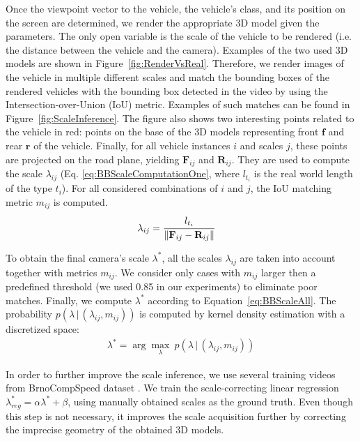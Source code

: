 \documentclass[]{elsarticle}
\begin{document}
Once the viewpoint vector to the vehicle, the vehicle's class, and its position on the screen are determined, we render the appropriate 3D model given the parameters.  The only open variable is the scale of the vehicle to be rendered (i.e. the distance between the vehicle and the camera).
Examples of the two used 3D models are shown in Figure~\ref{fig:RenderVsReal}. Therefore, we render images of the vehicle in multiple different scales and match the bounding boxes of the rendered vehicles with the bounding box detected in the video by using the Intersection-over-Union (IoU) metric. Examples of such matches can be found in Figure~\ref{fig:ScaleInference}. 
The figure also shows two interesting points related to the vehicle in red: points on the base of the 3D models representing front $\mathbf{f}$ and rear $\mathbf{r}$ of the vehicle. Finally, for all vehicle instances $i$ and scales $j$, these points are projected on the road plane, yielding $\mathbf{F}_{ij}$ and $\mathbf{R}_{ij}$. They are used to compute the scale $\lambda_{ij}$ (Eq. \eqref{eq:BBScaleComputationOne}, where $l_{t_i}$ is the real world length of the type $t_i$). 
For all considered combinations of $i$ and $j$, the IoU matching metric $m_{ij}$ is computed.
\begin{eqnarray}
&\lambda_{ij} = \cfrac{l_{t_i}}{\|\mathbf{F}_{ij}-\mathbf{R}_{ij}\|} &\label{eq:BBScaleComputationOne}
\end{eqnarray}



To obtain the final camera's scale $\lambda^*$, all the scales $\lambda_{ij}$ are taken into account together with metrics $m_{ij}$.  We consider only cases with $m_{ij}$ larger then a predefined threshold (we used 0.85 in our experiments) to eliminate poor matches. Finally, we compute $\lambda^*$ according to Equation~\eqref{eq:BBScaleAll}. The probability $p\left(\lambda\,|\,(\lambda_{ij}, m_{ij}) \right)$ is computed by kernel density estimation with a discretized space:
\begin{eqnarray}
&\lambda^* = \arg \max_\lambda~p\left(\lambda\,|\,(\lambda_{ij}, m_{ij}) \right) &\label{eq:BBScaleAll}
\end{eqnarray}

In order to further improve the scale inference, we use several training videos from BrnoCompSpeed dataset \citep{BrnoCompSpeed}. We train the scale-correcting linear regression $\lambda^*_{reg} = \alpha\lambda^* + \beta$, using manually obtained scales as the ground truth. Even though this step is not necessary, it improves the scale acquisition further by correcting the imprecise geometry of the obtained 3D models. 
\end{document}
